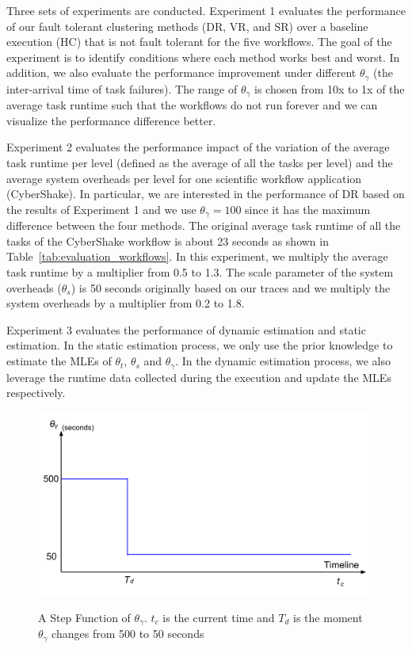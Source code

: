 Three sets of experiments are conducted. Experiment 1 evaluates the performance of our fault tolerant clustering methods (DR, VR, and SR) over a baseline execution (HC) that is not fault tolerant for the five workflows. The goal of the experiment is to identify conditions where each method works best and worst. In addition, we also evaluate the performance improvement under different $\theta_{\gamma}$ (the inter-arrival time of task failures). The range of $\theta_{\gamma}$ is chosen from 10x to 1x of the average task runtime such that the workflows do not run forever and we can visualize the performance difference better. 


Experiment 2 evaluates the performance impact of the variation of the average task runtime per level (defined as the average of all the tasks per level) and the average system overheads per level for one scientific workflow application (CyberShake). In particular, we are interested in the performance of DR based on the results of Experiment 1 and we use $\theta_{\gamma}=100$ since it has the maximum difference between the four methods. The original average task runtime of all the tasks of the CyberShake workflow is about 23 seconds as shown in Table~\ref{tab:evaluation_workflows}. In this experiment, we multiply the average task runtime by a multiplier from 0.5 to 1.3. The scale parameter of the system overheads ($\theta_{s}$) is 50 seconds originally based on our traces and we multiply the system overheads by a multiplier from 0.2 to 1.8.  

Experiment 3 evaluates the performance of dynamic estimation and static estimation. In the static estimation process, we only use the prior knowledge to estimate the MLEs of $\theta_t$, $\theta_s$ and $\theta_{\gamma}$. In the dynamic estimation process, we also leverage the runtime data collected during the execution and update the MLEs respectively. 

\begin{figure}[htb]
	\centering
	\includegraphics[width=0.8\linewidth]{figures/tolerance/step_signal.pdf} \\
	\caption{A Step Function of $\theta_{\gamma}$. $t_c$ is the current time and $T_d$ is the moment $\theta_{\gamma}$ changes from 500 to 50 seconds}
	\label{fig:evaluation_step_signal}
\end{figure}

